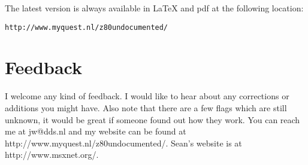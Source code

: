 \documentclass[oneside,a4paper]{book}
\begin{document}
The latest version is always available in {\LaTeX} and pdf at 
the following location: 

{\tt http://www.myquest.nl/z80undocumented/}


\section{Feedback}

I welcome any kind of feedback. I would like to hear about any corrections or additions you might have. Also note that there are a few flags which are still unknown, it would be great if someone found out how they work. You can reach me at {\ttfamily jw@dds.nl} and my website can be found at {\ttfamily http://www.myquest.nl/z80undocumented/}. Sean's website is at {\ttfamily http://www.msxnet.org/}.
\end{document}
